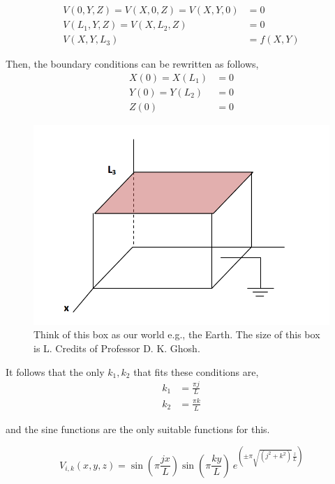 \documentclass{tufte-book}
\begin{document}
\begin{eqnarray}
V(0, Y, Z) = V(X, 0, Z) = V(X, Y, 0) &= 0\\
V(L_1, Y, Z) = V(X, L_2, Z) &= 0\\
V(X, Y, L_3) &= f(X, Y)
\end{eqnarray}

Then, the boundary conditions can be rewritten as follows,
\begin{eqnarray}
X(0) = X(L_1) &= 0\\
Y(0) = Y(L_2) &= 0\\
Z(0) &= 0
\end{eqnarray}

\begin{figure}
	\centering
	\label{fig:shorebox}
	\caption{Think of this box as our world e.g., the Earth. The size of this box is L. Credits of Professor D. K. Ghosh.}
	\includegraphics{./Figure/fig-shorebox.png}
\end{figure}

It follows that the only $k_1, k_2$ that fits these conditions are,
\begin{eqnarray}
k_1 &= \frac{\pi j}{L}\\
k_2 &= \frac{\pi k}{L}
\end{eqnarray}

and the sine functions are the only suitable functions for this. 

\begin{equation}
\label{eqn:general-solution}
	V_{i, k} (x, y, z) = \sin (\pi \frac{j x}{L}) \sin (\pi \frac{k y}{L})\ e^{\left( \pm \pi \sqrt{(j^2+k^2)}\frac{z}{L}\right)}
\end{equation}
\end{document}
